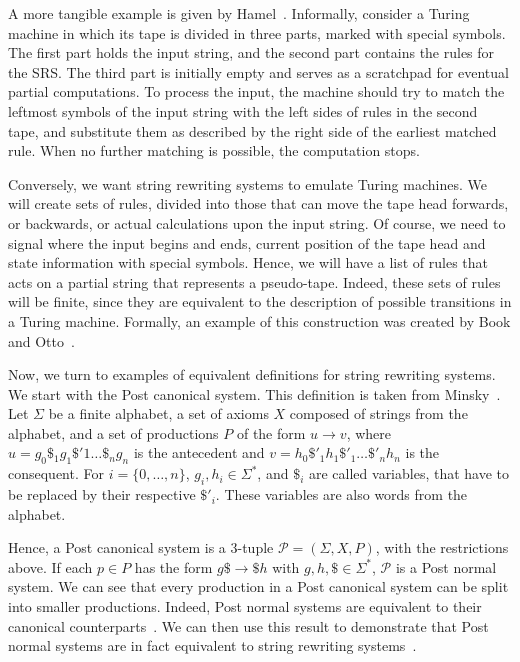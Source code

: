 \documentclass[12pt]{article}
\begin{document}
A more tangible example is given by Hamel~\cite{}. Informally, consider a Turing machine in which its tape is divided in three parts, marked with special symbols. The first part holds the input string, and the second part contains the rules for the SRS. The third part is initially empty and serves as a scratchpad for eventual partial computations. To process the input, the machine should try to match the leftmost symbols of the input string with the left sides of rules in the second tape, and substitute them as described by the right side of the earliest matched rule. When no further matching is possible, the computation stops.

Conversely, we want string rewriting systems to emulate Turing machines. We will create sets of rules, divided into those that can move the tape head forwards, or backwards, or actual calculations upon the input string. Of course, we need to signal where the input begins and ends, current position of the tape head and state information with special symbols. Hence, we will have a list of rules that acts on a partial string that represents a pseudo-tape. Indeed, these sets of rules will be finite, since they are equivalent to the description of possible transitions in a Turing machine. Formally, an example of this construction was created by Book and Otto~\cite{}.

Now, we turn to examples of equivalent definitions for string rewriting systems. We start with the Post canonical system. This definition is taken from Minsky~\cite{}. Let $\Sigma$ be a finite alphabet, a set of axioms $X$ composed of strings from the alphabet, and a set of productions $P$ of the form $u \rightarrow v$, where $u = g_{0}\$_{1}g_{1}\$'{1} \dots \$_{n}g_{n}$ is the antecedent and $v = h_{0}\$'_{1}h_{1}\$'_{1} \dots \$'_{n}h_{n}$ is the consequent. For $i = \{0, \dots, n\}$, $g_{i}, h_{i} \in \Sigma^{*}$, and $\$_{i}$ are called variables, that have to be replaced by their respective $\$'_{i}$. These variables are also words from the alphabet.

Hence, a Post canonical system is a $3$-tuple $\mathcal{P} = (\Sigma, X, P)$, with the restrictions above. If each $p \in P$ has the form $g\$ \rightarrow \$h$ with $g, h, \$ \in \Sigma^{*}$, $\mathcal{P}$ is a Post normal system. We can see that every production in a Post canonical system can be split into smaller productions. Indeed, Post normal systems are equivalent to their canonical counterparts~\cite[Theorem 13.1]{}. We can then use this result to demonstrate that Post normal systems are in fact equivalent to string rewriting systems~\cite[Sec. 6.5, Theorem 5.1]{}.
\end{document}
